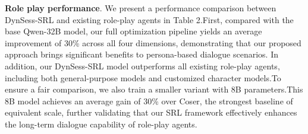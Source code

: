 \textbf{Role play performance}. 
We present a performance comparison between DynSess-SRL and existing role-play agents in Table 2.First, compared with the base Qwen-32B model, our full optimization pipeline yields an average improvement of 30\% across all four dimensions, demonstrating that our proposed approach brings significant benefits to persona-based dialogue scenarios.
In addition, our DynSess-SRL model outperforms all existing role-play agents, including both general-purpose models and customized character models.To ensure a fair comparison, we also train a smaller variant with 8B parameters.This 8B model achieves an average gain of 30\% over Coser, the strongest baseline of equivalent scale, further validating that our SRL framework effectively enhances the long-term dialogue capability of role-play agents.






